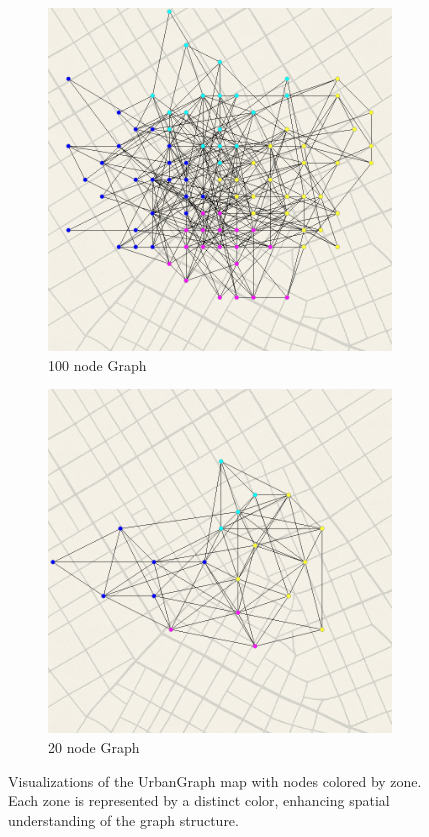 \documentclass[12pt]{article}
\begin{document}
\begin{figure}[H]
    \centering
    \begin{subfigure}[b]{0.48\textwidth}
        \includegraphics[width=\textwidth]{../Images/sampleMap_1.png}
        \caption{100 node Graph}
        \label{fig:mst-1}
    \end{subfigure}
    \hfill
    \begin{subfigure}[b]{0.48\textwidth}
        \includegraphics[width=\textwidth]{../Images/sampleMap_2.png}
        \caption{20 node Graph}
        \label{fig:mst-2}
    \end{subfigure}
    \caption{Visualizations of the UrbanGraph map with nodes colored by zone. Each zone is represented by a distinct color, enhancing spatial understanding of the graph structure.}
    \label{fig:mst-both}
\end{figure}
\end{document}
